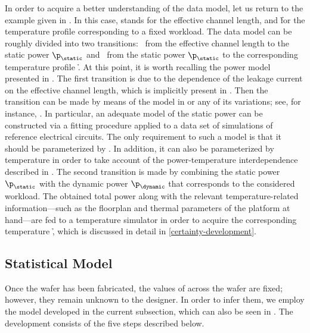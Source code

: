 In order to acquire a better understanding of the data model, let us return to
the example given in . In this case, \g stands for the
effective channel length, and \h for the temperature profile \mq corresponding
to a fixed workload. The data model can be roughly divided into two transitions:
\one~from the effective channel length \g to the static power $\p_\static$ and
\two~from the static power $\p_\static$ to the corresponding temperature profile
\h. At this point, it is worth recalling the power model presented in
. The first transition is due to the dependence of the leakage
current on the effective channel length, which is implicitly present in
. Then the transition can be made by means of the model in
 or any of its variations; see, for instance,
\cite{chandrakasan2000, srivastava2010, juan2012}. In particular, an adequate
model of the static power can be constructed via a fitting procedure applied to
a data set of  simulations of reference electrical circuits. The only
requirement to such a model is that it should be parameterized by \g. In
addition, it can also be parameterized by temperature in order to take account
of the power-temperature interdependence described in . The
second transition is made by combining the static power $\p_\static$ with the
dynamic power $\p_\dynamic$ that corresponds to the considered workload. The
obtained total power along with the relevant temperature-related
information---such as the floorplan and thermal parameters of the platform at
hand---are fed to a temperature simulator in order to acquire the corresponding
temperature \h, which is discussed in detail in \cref{certainty-development}.

\subsection{Statistical Model}

Once the wafer has been fabricated, the values of \g across the wafer are fixed;
however, they remain unknown to the designer. In order to infer them, we employ
the model developed in the current subsection, which can also be seen in
. The development consists of the five steps
described below.


